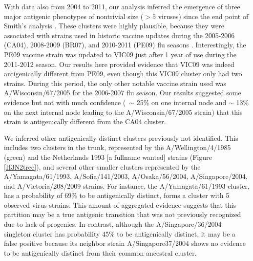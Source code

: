 \documentclass[11pt,oneside,letterpaper]{article}
\begin{document}



With data also from 2004 to 2011, our analysis inferred the emergence of three major antigenic phenotypes of nontrivial size ($>5$ viruses) since the end point of Smith's analysis \cite{smith_mapping_2004}.  
These clusters were highly plausible, because they were associated with strains used in historic vaccine updates during the 2005-2006 (CA04), 2008-2009 (BR07), and 2010-2011 (PE09) flu seasons \cite{WHO VACCINE REPORT}. 
Interestingly, the PE09 vaccine strain was updated to VIC09 just after 1 year of use during the 2011-2012 season. 
Our results here provided evidence that VIC09 was indeed antigenically different from PE09, even though this VIC09 cluster only had two strains.
During this period, the only other notable vaccine strain used was A/Wisconsin/67/2005 for the 2006-2007 flu season.
Our results suggested some evidence but not with much confidence (~$\sim$ 25\% on one internal node and $\sim$ 13\% on the next internal node leading to the A/Wisconsin/67/2005 strain) that this strain is antigenically different from the CA04 cluster.

We inferred other antigenically distinct clusters previously not identified. 
This includes two clusters in the trunk, represented by the A/Wellington/4/1985 (green) and the Netherlands 1993 [a fullname wanted] strains (Figure \ref{H3N2tree}), and several other smaller clusters represented by the A/Yamagata/61/1993, A/Sofia/141/2003, A/Osaka/56/2004,  A/Singapore/2004, and A/Victoria/208/2009 strains. 
For instance, the A/Yamagata/61/1993 cluster, has a probability of 69\% to be antigenically distinct, forms a cluster with  5 observed virus strains. 
This amount of aggregated evidence suggests that this partition may be a true antigenic transition that was not previously recognized due to lack of progenies. 
In contrast, although the A/Singapore/36/2004 singleton cluster has probability 45\% to be antigenically distinct, it may be a false positive because its neighbor strain A/Singapore37/2004  shows no evidence to be antigenically distinct from their common ancestral cluster. 
\end{document}
